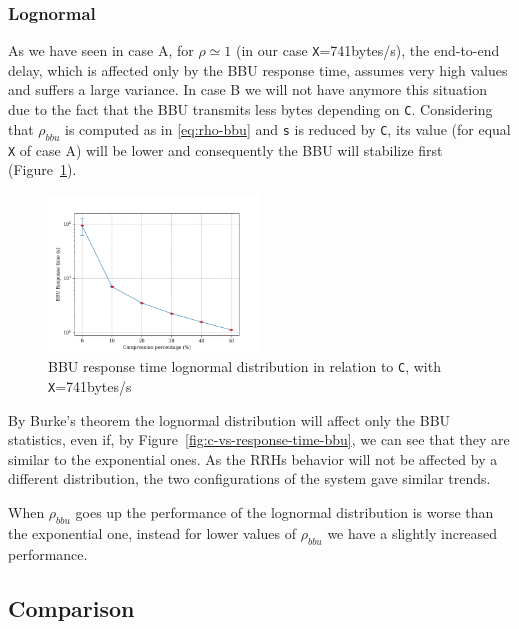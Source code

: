 \documentclass[11pt,a4paper,oneside, openright]{article}
\begin{document}
\subsubsection{Lognormal}
As we have seen in case A, for $\rho \simeq 1$ (in our case \texttt{X}=741bytes/s), the end-to-end delay, which is affected only by the BBU response time, assumes very high values and suffers a large variance. In case B we will not have anymore this situation due to the fact that the BBU transmits less bytes depending on \texttt{C}. Considering that $\rho_{bbu}$ is computed as in \ref{eq:rho-bbu} and \texttt{s} is reduced by \texttt{C}, its value (for equal \texttt{X} of case A) will be lower and consequently the BBU will stabilize first (Figure~\ref{fig:c-vs-resp-741-logn}).

\begin{figure}[h]
	\centering
	\includegraphics[width=0.5\textwidth]{images/response-time-bbu-741-logn}
	\caption{BBU response time lognormal distribution in relation to \texttt{C}, with \texttt{X}=741bytes/s}
	\label{fig:c-vs-resp-741-logn}
\end{figure}

By Burke's theorem the lognormal distribution will affect only the BBU statistics, even if, by Figure~\ref{fig:c-vs-response-time-bbu}, we can see that they are similar to the exponential ones. As the RRHs behavior will not be affected by a different distribution, the two configurations of the system gave similar trends. 

When $\rho_{bbu}$ goes up the performance of the lognormal distribution is worse than the exponential one, instead for lower values of $\rho_{bbu}$ we have a slightly increased performance. %


\subsection{Comparison}
\end{document}
